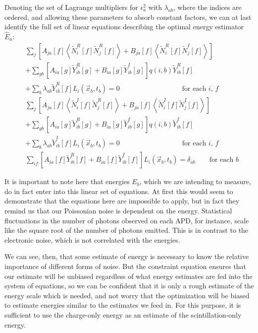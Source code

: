 Denoting the set of Lagrange multipliers for $\epsilon^2_a$ with $\lambda_{ab}$, where the indices are ordered, and allowing these parameters to absorb constant factors, we can at last identify the full set of linear equations describing the optimal energy estimator $\widehat{E}_a$:
\begin{subequations}\label{eqn:SystemToSolve}\begin{align}
&\sum_j \left[ A_{ja}[f] \left<\widetilde{N}_i^R[f]\widetilde{N}_j^R[f]\right> + B_{ja}[f] \left<\widetilde{N}_i^R[f]\widetilde{N}_j^I[f]\right>\right]\nonumber\\
&+ \sum_{gb} \left[A_{ia}[g] \widetilde{Y}_{ib}^R[g] + B_{ia}[g] \widetilde{Y}_{ib}^I[g]\right] q(i,b) \widetilde{Y}_{ib}^R[f] \nonumber\\
&+ \sum_b \lambda_{ab} \widetilde{Y}^R_{ib}[f] L_i(\vec{x}_b,t_b) = 0 \qquad \qquad \qquad \qquad \quad \text{for each $i$, $f$}\\
%
&\sum_j \left[ A_{ja}[f] \left<\widetilde{N}_i^I[f]\widetilde{N}_j^R[f]\right> + B_{ja}[f] \left<\widetilde{N}_i^I[f]\widetilde{N}_j^I[f]\right>\right]\nonumber\\
&+ \sum_{gb} \left[A_{ia}[g] \widetilde{Y}_{ib}^R[g] + B_{ia}[g] \widetilde{Y}_{ib}^I[g]\right] q(i,b) \widetilde{Y}_{ib}^I[f] \nonumber\\
&+ \sum_b \lambda_{ab} \widetilde{Y}^I_{ib}[f] L_i(\vec{x}_b,t_b) = 0 \qquad \qquad \qquad \qquad \quad \text{for each $i$, $f$}\\
%
&\sum_{if}\left[A_{ia}[f] \widetilde{Y}_{ib}^R[f] + B_{ia}[f] \widetilde{Y}_{ib}^I[f]\right] L_i(\vec{x}_b,t_b) = \delta_{ab} \qquad \text{for each $b$}
\end{align}\end{subequations}

It is important to note here that energies $E_b$, which we are intending to measure, do in fact enter into this linear set of equations.  At first this would seem to demonstrate that the equations here are impossible to apply, but in fact they remind us that our Poissonian noise is dependent on the energy.  Statistical fluctuations in the number of photons observed on each APD, for instance, scale like the square root of the number of photons emitted.  This is in contrast to the electronic noise, which is not correlated with the energies.

We can see, then, that some estimate of energy is necessary to know the relative importance of different forms of noise.  But the constraint equation ensures that our estimate will be unbiased regardless of what energy estimates are fed into the system of equations, so we can be confident that it is only a rough estimate of the energy scale which is needed, and not worry that the optimization will be biased to estimate energies similar to the estimates we feed in.  For this purpose, it is sufficient to use the charge-only energy as an estimate of the scintillation-only energy.

